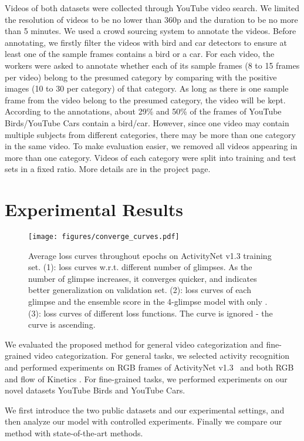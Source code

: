 \documentclass[runningheads]{llncs}
\begin{document}
Videos of both datasets were collected through YouTube video search. We limited the resolution of videos to be no lower than 360p and the duration to be no more than 5 minutes.
We used a crowd sourcing system to annotate the videos. Before annotating, we firstly filter the videos with bird and car detectors to ensure at least one of the sample frames contains a bird or a car. For each video, the workers were asked to annotate whether each of its sample frames (8 to 15 frames per video) belong to the presumed category by comparing with the positive images (10 to 30 per category) of that category. 
As long as there is one sample frame from the video belong to the presumed category, the video will be kept.
According to the annotations, about 29\% and 50\% of the frames of YouTube Birds/YouTube Cars contain a bird/car.
However, since one video may contain multiple subjects from different categories, there may be more than one category in the same video. To make evaluation easier, we removed all videos appearing in more than one category. Videos of each category were split into training and test sets in a fixed ratio. More details are in the project page.

 \section{Experimental Results}








\begin{figure*}
\centering
\texttt{[image: figures/converge\_curves.pdf]}
\caption{Average loss curves throughout epochs on ActivityNet v1.3 training set. (1): loss curves w.r.t. different number of glimpses. As the number of glimpse increases, it converges quicker, and indicates better generalization on validation set. (2): loss curves of each glimpse and the ensemble score in the 4-glimpse model with only . (3): loss curves of different loss functions. The  curve is ignored - the curve is ascending.}
\label{fig:loss_curve}
\end{figure*}
We evaluated the proposed method for general video categorization and fine-grained video categorization. For general tasks, we selected activity recognition and performed experiments on RGB frames of ActivityNet v1.3~\cite{caba2015activitynet} and both RGB and flow of Kinetics \cite{kay2017kinetics}. For fine-grained tasks, we performed experiments on our novel datasets YouTube Birds and YouTube Cars.\par
We first introduce the two public datasets and our experimental settings, and then analyze our model with controlled experiments. Finally we compare our method with state-of-the-art methods.
\end{document}

